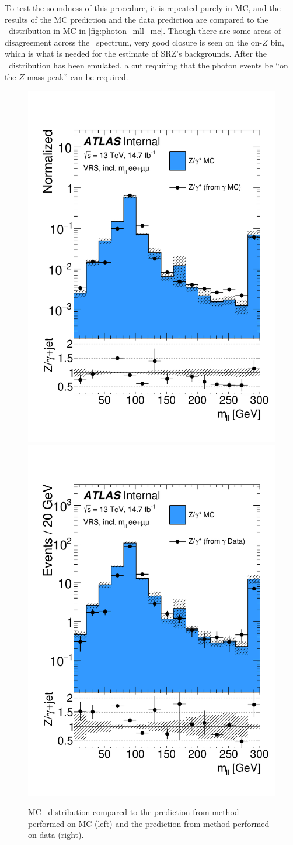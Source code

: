 To test the soundness of this procedure, it is repeated purely in \ac{MC}, and the results of the \ac{MC} prediction and the data prediction are compared to the \mll~distribution in \dyjets \ac{MC} in \autoref{fig:photon_mll_mc}. Though there are some areas of disagreement across the \mll~spectrum, very good closure is seen on the on-$Z$ bin, which is what is needed for the estimate of SRZ's backgrounds. After the \mll~distribution has been emulated, a cut requiring that the photon events be ``on the $Z$-mass peak'' can be required.

\begin{centering}
\begin{figure}[!hbt]
\myfloatalign
\includegraphics[width=.45\linewidth]{figures/photons/DataMC_GJ_ee+mm_zmet_GMC.pdf}
\includegraphics[width=.45\linewidth]{figures/photons/DataMC_GJ_ee+mm_zmet_ZMC.pdf}
\caption{\dyjets \ac{MC} \mll~distribution compared to the prediction from \gjets method performed on \ac{MC} (left) and the prediction from \gjets method performed on data (right).}
\label{fig:photon_mll_mc}
\end{figure}
\end{centering}

